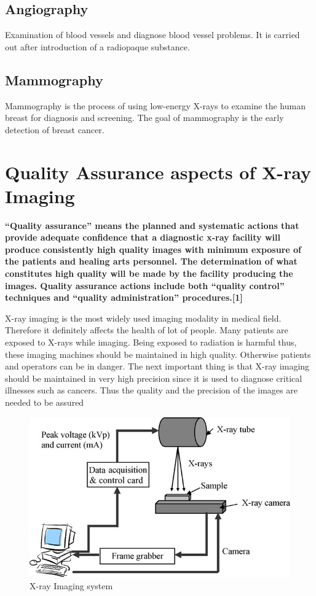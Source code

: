 \documentclass[12pt]{article}
\begin{document}
\subsection{Angiography}
Examination of blood vessels and diagnose blood vessel problems. It is carried out after introduction of a radiopaque substance.
\subsection{Mammography}
Mammography is the process of using low-energy X-rays to examine the human breast for diagnosis and screening. The goal of mammography is the early detection of breast cancer.

\pagebreak
\section{Quality Assurance aspects of X-ray Imaging}
\textbf{“Quality assurance” means the planned and systematic actions that provide adequate
confidence that a diagnostic x-ray facility will produce consistently high quality images with
minimum exposure of the patients and healing arts personnel. The determination of what
constitutes high quality will be made by the facility producing the images. Quality assurance
actions include both “quality control” techniques and “quality administration” procedures.[1]}

X-ray imaging is the most widely used imaging modality in medical field. Therefore it definitely affects the health of lot of people. Many patients are exposed to X-rays while imaging. Being exposed to radiation is harmful thus, these imaging machines should be maintained in high quality. Otherwise patients and operators can be in danger. The next important thing is that  X-ray imaging should be maintained in very high precision since it is used to diagnose critical illnesses such as cancers. Thus the quality and the precision of the images are needed to be assured

\begin{figure}[h!]
  \centering
  \includegraphics[width=1.1\linewidth]{xmodel.png}
  \caption{\small{X-ray Imaging system}}
  \label{fig:Imaging system}
\end{figure}
\end{document}
